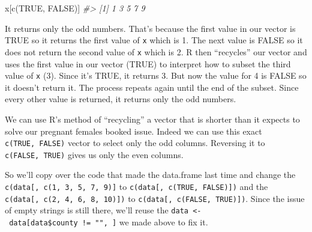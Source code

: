 \documentclass[
]{krantz}
\makeatletter
\newenvironment{Shaded}{\begin{snugshade}}{\end{snugshade}}
\newcommand{\CommentTok}[1]{\textcolor[rgb]{0.37,0.37,0.37}{\textit{#1}}}
\newcommand{\ConstantTok}[1]{\textcolor[rgb]{0,0,0}{#1}}
\newcommand{\FunctionTok}[1]{\textcolor[rgb]{0,0,0}{#1}}
\newcommand{\NormalTok}[1]{#1}
\newenvironment{kframe}{%
\medskip{}
\setlength{\fboxsep}{.8em}
 \def\at@end@of@kframe{}%
 \ifinner\ifhmode%
  \def\at@end@of@kframe{\end{minipage}}%
  \begin{minipage}{\columnwidth}%
 \fi\fi%
 \def\FrameCommand##1{\hskip\@totalleftmargin \hskip-\fboxsep
 \colorbox{shadecolor}{##1}\hskip-\fboxsep
     \hskip-\linewidth \hskip-\@totalleftmargin \hskip\columnwidth}%
 \MakeFramed {\advance\hsize-\width
   \@totalleftmargin\z@ \linewidth\hsize
   \@setminipage}}%
 {\par\unskip\endMakeFramed%
 \at@end@of@kframe}
\renewenvironment{Shaded}{\begin{kframe}}{\end{kframe}}
\makeatother
\begin{document}
\begin{Shaded}
\begin{Highlighting}[]
\NormalTok{x[}\FunctionTok{c}\NormalTok{(}\ConstantTok{TRUE}\NormalTok{, }\ConstantTok{FALSE}\NormalTok{)]}
\CommentTok{\#\textgreater{} [1] 1 3 5 7 9}
\end{Highlighting}
\end{Shaded}

It returns only the odd numbers. That's because the first value in our vector is TRUE so it returns the first value of \texttt{x} which is 1. The next value is FALSE so it does not return the second value of \texttt{x} which is 2. R then ``recycles'' our vector and uses the first value in our vector (TRUE) to interpret how to subset the third value of \texttt{x} (3). Since it's TRUE, it returns 3. But now the value for 4 is FALSE so it doesn't return it. The process repeats again until the end of the subset. Since every other value is returned, it returns only the odd numbers.

We can use R's method of ``recycling'' a vector that is shorter than it expects to solve our pregnant females booked issue. Indeed we can use this exact \texttt{c(TRUE,\ FALSE)} vector to select only the odd columns. Reversing it to \texttt{c(FALSE,\ TRUE)} gives us only the even columns.

So we'll copy over the code that made the data.frame last time and change the \texttt{c(data{[},\ c(1,\ 3,\ 5,\ 7,\ 9){]}} to \texttt{c(data{[},\ c(TRUE,\ FALSE){]})} and the \texttt{c(data{[},\ c(2,\ 4,\ 6,\ 8,\ 10){]})} to \texttt{c(data{[},\ c(FALSE,\ TRUE){]})}. Since the issue of empty strings is still there, we'll reuse the \texttt{data\ \textless{}-\ data{[}data\$county\ !=\ "",\ {]}} we made above to fix it.
\end{document}
